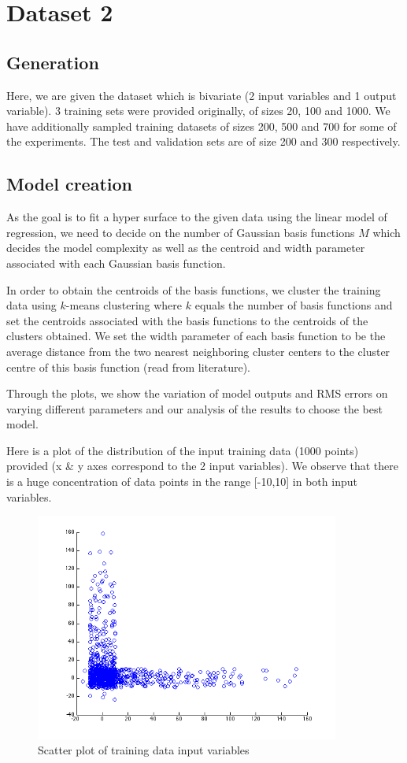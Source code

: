 \documentclass{article}
\begin{document}
\section{Dataset 2}

\subsection{Generation}
Here, we are given the dataset which is bivariate (2 input variables and 1 output variable). 3 training sets were provided originally, of sizes 20, 100 and 1000. We have additionally sampled training datasets of sizes 200, 500 and 700 for some of the experiments. The test and validation sets are of size 200 and 300 respectively.

\subsection{Model creation}

As the goal is to fit a hyper surface to the given data using the linear model of regression, we need to decide on the number of Gaussian basis functions $M$ which decides the model complexity as well as the centroid and width parameter associated with each Gaussian basis function. 

In order to obtain the centroids of the basis functions, we cluster the training data using $k$-means clustering where $k$ equals the number of basis functions and set the centroids associated with the basis functions to the centroids of the clusters obtained. We set the width parameter of each basis function to be the average distance from the two nearest neighboring cluster centers to the cluster centre of this basis function (read from literature).

Through the plots, we show the variation of model outputs and RMS errors on varying different  parameters and our analysis of the results to choose the best model.

Here is a plot of the distribution of the input training data (1000 points) provided (x \& y axes correspond to the 2 input variables). We observe that there is a huge concentration of data points in the range [-10,10] in both input variables.
\begin{figure}[H]
\centering
\includegraphics[width=100mm]{data_scatter}
\caption{Scatter plot of training data input variables}
\label{fig:plot}
\end{figure}
\end{document}
